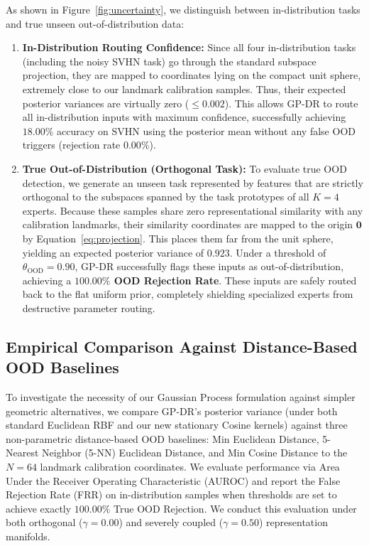 As shown in Figure~\ref{fig:uncertainty}, we distinguish between in-distribution tasks and true unseen out-of-distribution data:
\begin{enumerate}
    \item \textbf{In-Distribution Routing Confidence:} Since all four in-distribution tasks (including the noisy SVHN task) go through the standard subspace projection, they are mapped to coordinates lying on the compact unit sphere, extremely close to our landmark calibration samples. Thus, their expected posterior variances are virtually zero ($\le 0.002$). This allows GP-DR to route all in-distribution inputs with maximum confidence, successfully achieving $18.00\%$ accuracy on SVHN using the posterior mean without any false OOD triggers (rejection rate $0.00\%$).
    \item \textbf{True Out-of-Distribution (Orthogonal Task):} To evaluate true OOD detection, we generate an unseen task represented by features that are strictly orthogonal to the subspaces spanned by the task prototypes of all $K=4$ experts. Because these samples share zero representational similarity with any calibration landmarks, their similarity coordinates are mapped to the origin $\mathbf{0}$ by Equation~\ref{eq:projection}. This places them far from the unit sphere, yielding an expected posterior variance of $0.923$. Under a threshold of $\theta_{\text{OOD}} = 0.90$, GP-DR successfully flags these inputs as out-of-distribution, achieving a \textbf{$100.00\%$ OOD Rejection Rate}. These inputs are safely routed back to the flat uniform prior, completely shielding specialized experts from destructive parameter routing.
\end{enumerate}

\subsection{Empirical Comparison Against Distance-Based OOD Baselines}
\label{sec:ood_baselines}
To investigate the necessity of our Gaussian Process formulation against simpler geometric alternatives, we compare GP-DR's posterior variance (under both standard Euclidean RBF and our new stationary Cosine kernels) against three non-parametric distance-based OOD baselines: Min Euclidean Distance, 5-Nearest Neighbor (5-NN) Euclidean Distance, and Min Cosine Distance to the $N=64$ landmark calibration coordinates. We evaluate performance via Area Under the Receiver Operating Characteristic (AUROC) and report the False Rejection Rate (FRR) on in-distribution samples when thresholds are set to achieve exactly $100.00\%$ True OOD Rejection. We conduct this evaluation under both orthogonal ($\gamma = 0.00$) and severely coupled ($\gamma = 0.50$) representation manifolds.

